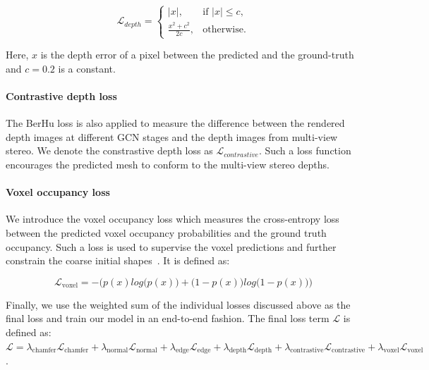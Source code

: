 \begin{equation}
  \mathcal{L}_{depth}=\begin{cases}
    |x|, & \text{if $|x| \le c$},\\
    \frac{x^2 + c^2}{2c}, & \text{otherwise}.
  \end{cases}
\end{equation}

\noindent Here, $x$ is the depth error of a pixel between the predicted and the ground-truth and $c=0.2$ is a constant.

\paragraph{Contrastive depth loss}\vspace{-4mm}
The BerHu loss is also applied to measure the difference between the rendered depth images at different GCN stages and the depth images from multi-view stereo.
We denote the constrastive depth loss as $\mathcal{L}_{contrastive}$.
Such a loss function encourages the predicted mesh to conform to the multi-view stereo depths.

\paragraph{Voxel occupancy loss}\vspace{-4mm}
We introduce the voxel occupancy loss which measures the cross-entropy loss between the predicted voxel occupancy probabilities and the ground truth occupancy.
Such a loss is used to supervise the voxel predictions and further constrain the coarse initial shapes~\cite{gkioxari2019meshrcnn}.
It is defined as:
\begin{small}
\begin{equation}
\mathcal{L}_{\text{voxel}} = -{\Big(p(x) log\big(p(x)\big) + \big(1 - p(x)\big)log\big(1 - p(x)\big)\Big)}
\end{equation}
\end{small}

\vspace{-4mm}
Finally, we use the weighted sum of the individual losses discussed above as the final loss and train our model in an end-to-end fashion.
The final loss term $\mathcal{L}$ is defined as:
$\mathcal{L} = \lambda_{\text{chamfer}}\mathcal{L}_{\text{chamfer}} + \lambda_{\text{normal}}\mathcal{L}_{\text{normal}} + \lambda_{\text{edge}}\mathcal{L}_{\text{edge}} + \lambda_{\text{depth}}\mathcal{L}_{\text{depth}} + \lambda_{\text{contrastive}}\mathcal{L}_{\text{contrastive}} + \lambda_{\text{voxel}}\mathcal{L}_{\text{voxel}}$.
